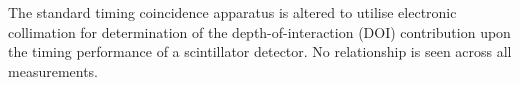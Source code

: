 The standard timing coincidence apparatus is altered to utilise electronic collimation for determination of the depth-of-interaction (DOI) contribution upon the timing performance of a scintillator detector. No relationship is seen across all measurements.